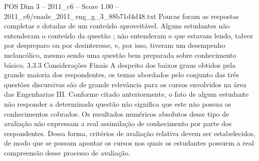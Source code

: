 \begin{textsample}{POS Dim 3 – 2011\_c6 – Score 1.00 – 2011\_c6/enade\_2011\_eng\_g\_3\_88b71d4d48.txt}
Poucas foram as respostas completas e dotadas de um conteúdo aproveitável.
Alguns estudantes não entenderam o conteúdo da questão ; não entenderam o que estavam lendo, talvez por despreparo ou por desinteresse, e, por isso, tiveram um desempenho melancólico, mesmo sendo uma questão bem preparada sobre conhecimento básico. 3.3.3 Considerações Finais A despeito dos baixos graus obtidos pela grande maioria dos respondentes, os temas abordados pelo conjunto das três questões discursivas são de grande relevância para os cursos envolvidos na área das Engenharias III.
Conforme citado anteriormente, o fato de algum estudante não responder a determinada questão não significa que este não possua os conhecimentos cobrados.
Os resultados numéricos absolutos desse tipo de avaliação não expressam a real assimilação de conhecimento por parte dos respondentes.
Dessa forma, critérios de avaliação relativa devem ser estabelecidos, de modo que se possam apontar os cursos nos quais os estudantes possuem a real compreensão desse processo de avaliação.

\end{textsample}
